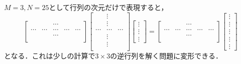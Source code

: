 $M = 3, N = 25$として行列の次元だけで表現すると，
\begin{equation*}
\left[
\begin{array}{ccccc}
 &  & \cdots & &\\
\cdots & \cdots &  \cdots & \cdots & \cdots \\
 &  & \cdots & &\\
\end{array}
\right]
\left[
\begin{array}{ccc}
& \vdots &\\
& \vdots &\\
\cdots & \cdots &  \cdots\\
& \vdots &\\
& \vdots &\\
\end{array}
\right]
\left[
\begin{array}{c}
\vdots\\
\vdots\\
\vdots
\end{array}
\right]
=
\left[
\begin{array}{ccccc}
 &  & \cdots & &\\
\cdots & \cdots &  \cdots & \cdots & \cdots \\
 &  & \cdots & &\\
\end{array}
\right]
\left[
\begin{array}{c}
\vdots\\
\vdots\\
\vdots\\
\vdots\\
\vdots
\end{array}
\right]
\end{equation*}
となる．これは少しの計算で$3 \times 3$の逆行列を解く問題に変形できる．


